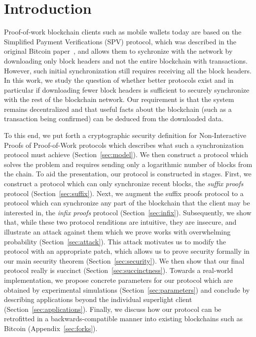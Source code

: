 \section{Introduction}

Proof-of-work blockchain clients such as mobile wallets today are based on the
Simplified Payment Verifications (SPV) protocol, which was described in the
original Bitcoin paper~\cite{bitcoin}, and allows them to sychronize with the
network by downloading only block headers and not the entire blockchain with
transactions. However, such initial synchronization still requires receiving all
the block headers. In this work, we study the question of whether better
protocols exist and in particular if downloading fewer block headers is
sufficient to securely synchronize with the rest of the blockchain network. Our
requirement is that the system remains decentralized and that useful facts about
the blockchain (such as a transaction being confirmed) can be
deduced from the downloaded data.

To this end, we put forth a cryptographic security definition for
Non-Interactive Proofs of Proof-of-Work protocols which describes what such a
synchronization protocol must achieve (Section~\ref{sec:model}). We then
construct a protocol which solves the problem and requires sending only a
logarithmic number of blocks from the chain. To aid the presentation, our
protocol is constructed in stages. First, we construct a protocol which can only
synchronize recent blocks, the \emph{suffix proofs} protocol
(Section~\ref{sec:suffix}). Next, we augment the suffix proofs protocol to a
protocol which can synchronize any part of the blockchain that the client may be
interested in, the \emph{infix proofs} protocol (Section~\ref{sec:infix}).
Subsequently, we show that, while these two protocol renditions are intuitive,
they are insecure, and illustrate an attack against them which we prove works
with overwhelming probability (Section~\ref{sec:attack}). This attack motivates
us to modify the protocol with an appropriate patch, which allows us to prove
security formally in our main security theorem (Section~\ref{sec:security}). We
then show that our final protocol really is succinct
(Section~\ref{sec:succinctness}). Towards a real-world implementation, we
propose concrete parameters for our protocol which are obtained by experimental
simulations (Section~\ref{sec:parameters}) and conclude by describing
applications beyond the individual superlight client
(Section~\ref{sec:applications}). Finally, we discuss how our protocol can be
retrofitted in a backwards-compatible manner into existing blockchains such as
Bitcoin (Appendix~\ref{sec:forks}).

